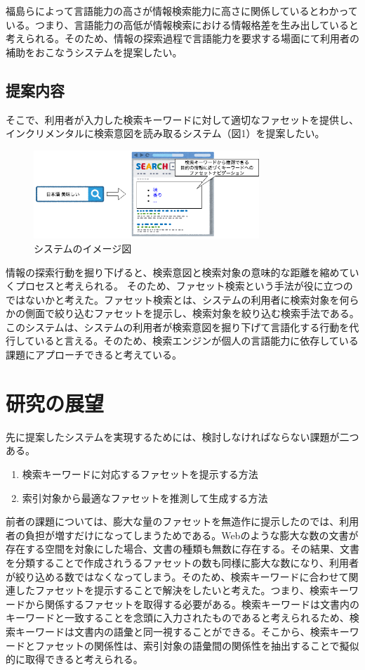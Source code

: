 \documentclass[a4j,12pt, twocolumn]{jarticle}
\begin{document}
 福島らによって言語能力の高さが情報検索能力に高さに関係しているとわかっている\cite{fukushima}。つまり、言語能力の高低が情報検索における情報格差を生み出していると考えられる。そのため、情報の探索過程で言語能力を要求する場面にて利用者の補助をおこなうシステムを提案したい。
\subsection{提案内容}

 そこで、利用者が入力した検索キーワードに対して適切なファセットを提供し、インクリメンタルに検索意図を読み取るシステム（図1）を提案したい。

 \begin{figure}[h]
   \includegraphics[width=85mm]{./new_ir_with_navi.png}
   \caption{システムのイメージ図}
 \end{figure}
 
 情報の探索行動を掘り下げると、検索意図と検索対象の意味的な距離を縮めていくプロセスと考えられる。 そのため、ファセット検索という手法が役に立つのではないかと考えた。ファセット検索とは、システムの利用者に検索対象を何らかの側面で絞り込むファセットを提示し、検索対象を絞り込む検索手法である\cite{faceted}。このシステムは、システムの利用者が検索意図を掘り下げて言語化する行動を代行していると言える。そのため、検索エンジンが個人の言語能力に依存している課題にアプローチできると考えている。
\section{研究の展望}
 先に提案したシステムを実現するためには、検討しなければならない課題が二つある。
\begin{enumerate}
  \item 検索キーワードに対応するファセットを提示する方法
  \item 索引対象から最適なファセットを推測して生成する方法
\end{enumerate}

 前者の課題については、膨大な量のファセットを無造作に提示したのでは、利用者の負担が増すだけになってしまうためである。Webのような膨大な数の文書が存在する空間を対象にした場合、文書の種類も無数に存在する。その結果、文書を分類することで作成されうるファセットの数も同様に膨大な数になり、利用者が絞り込める数ではなくなってしまう。そのため、検索キーワードに合わせて関連したファセットを提示することで解決をしたいと考えた。つまり、検索キーワードから関係するファセットを取得する必要がある。検索キーワードは文書内のキーワードと一致することを念頭に入力されたものであると考えられるため、検索キーワードは文書内の語彙と同一視することができる。そこから、検索キーワードとファセットの関係性は、索引対象の語彙間の関係性を抽出することで擬似的に取得できると考えられる。
\end{document}
